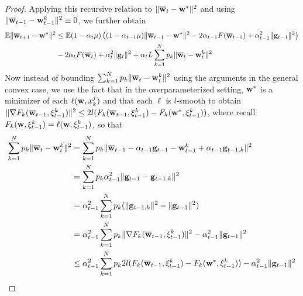 \begin{proof}
	Applying this recursive relation to $\|{\overline{\mathbf{w}}}_{t}-{\mathbf{w}}^{\ast}\|^{2}$
	and using $\|{\overline{\mathbf{w}}}_{t-1}-{\mathbf{w}}_{t-1}^{k}\|^{2}\equiv0$, we further
	obtain 
	\begin{align*}
	\mathbb{E}\|{\overline{\mathbf{w}}}_{t+1}-{\mathbf{w}}^{\ast}\|^{2} & \leq\mathbb{E}(1-\alpha_{t}\mu)\left((1-\alpha_{t-1}\mu)\|{\overline{\mathbf{w}}}_{t-1}-{\mathbf{w}}^{\ast}\|^{2}-2\alpha_{t-1}F({\overline{\mathbf{w}}}_{t-1})+\alpha_{t-1}^{2}\|{\mathbf{g}}_{t-1}\|^{2}\right)\\
	& -2\alpha_{t}F({\overline{\mathbf{w}}}_{t})+\alpha_{t}^{2}\|{\mathbf{g}}_{t}\|^{2}+\alpha_{t}L\sum_{k=1}^{N}p_{k}\|{\overline{\mathbf{w}}}_{t}-{\mathbf{w}}_{t}^{k}\|^{2}
	\end{align*}
	Now instead of bounding $\sum_{k=1}^{N}p_{k}\|{\overline{\mathbf{w}}}_{t}-{\mathbf{w}}_{t}^{k}\|^{2}$
	using the arguments in the general convex case, we use the fact that
	in the overparameterized setting, ${\mathbf{w}}^{\ast}$ is a minimizer of each
	$\ell({\mathbf{w}},x_{k}^{j})$ and that each $\ell$ is $l$-smooth to obtain
	$\|\nabla F_{k}({\overline{\mathbf{w}}}_{t-1},\xi_{t-1}^{k})\|^{2}\leq2l(F_{k}({\overline{\mathbf{w}}}_{t-1},\xi_{t-1}^{k})-F_{k}({\mathbf{w}}^{\ast},\xi_{t-1}^{k}))$,
	where recall $F_{k}({\mathbf{w}},\xi_{t-1}^{k})=\ell({\mathbf{w}},\xi_{t-1}^{k})$, so that
	\begin{align*}
	\sum_{k=1}^{N}p_{k}\|{\overline{\mathbf{w}}}_{t}-{\mathbf{w}}_{t}^{k}\|^{2} & =\sum_{k=1}^{N}p_{k}\|{\overline{\mathbf{w}}}_{t-1}-\alpha_{t-1}{\mathbf{g}}_{t-1}-{\mathbf{w}}_{t-1}^{k}+\alpha_{t-1}{\mathbf{g}}_{t-1,k}\|^{2}\\
	& =\sum_{k=1}^{N}p_{k}\alpha_{t-1}^{2}\|{\mathbf{g}}_{t-1}-{\mathbf{g}}_{t-1,k}\|^{2}\\
	& =\alpha_{t-1}^{2}\sum_{k=1}^{N}p_{k}(\|{\mathbf{g}}_{t-1,k}\|^{2}-\|{\mathbf{g}}_{t-1}\|^{2})\\
	& =\alpha_{t-1}^{2}\sum_{k=1}^{N}p_{k}\|\nabla F_{k}({\overline{\mathbf{w}}}_{t-1},\xi_{t-1}^{k})\|^{2}-\alpha_{t-1}^{2}\|{\mathbf{g}}_{t-1}\|^{2}\\
	& \le\alpha_{t-1}^{2}\sum_{k=1}^{N}p_{k}2l(F_{k}({\overline{\mathbf{w}}}_{t-1},\xi_{t-1}^{k})-F_{k}({\mathbf{w}}^{\ast},\xi_{t-1}^{k}))-\alpha_{t-1}^{2}\|{\mathbf{g}}_{t-1}\|^{2}
	\end{align*}
	\begin{comment}
	(In the Nesterov case)
	\begin{align*}
	\mathbf{v}_{t+1}^{k} & =\mathbf{w}_{t}^{k}-\alpha_{t}\mathbf{g}_{t,k}\\
	\mathbf{w}_{t+1}^{k} & =\begin{cases}
	\mathbf{v}_{t+1}^{k}+\beta_{t}(\mathbf{v}_{t+1}^{k}-\mathbf{v}_{t}^{k}) & \text{if }t+1\notin\mathcal{I}_{E}\\
	\sum_{k=1}^{N}p_{k}\left[\mathbf{v}_{t+1}^{k}+\beta_{t}(\mathbf{v}_{t+1}^{k}-\mathbf{v}_{t}^{k})\right] & \text{if }t+1\in\mathcal{I}_{E}
	\end{cases}

\end{comment}
\end{proof}
